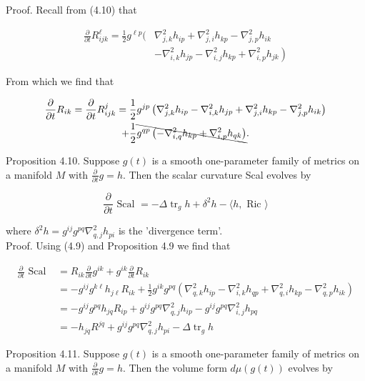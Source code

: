 \documentclass[10pt, letterpaper]{article}
\begin{document}
Proof. Recall from (4.10) that

$$
\begin{aligned}
\frac{\partial}{\partial t} R_{i j k}^{\ell}=\frac{1}{2} g^{\ell p}( & \nabla_{j, k}^{2} h_{i p}+\nabla_{j, i}^{2} h_{k p}-\nabla_{j, p}^{2} h_{i k} \\
& \left.-\nabla_{i, k}^{2} h_{j p}-\nabla_{i, j}^{2} h_{k p}+\nabla_{i, p}^{2} h_{j k}\right)
\end{aligned}
$$

From which we find that

$$
\begin{gathered}
\frac{\partial}{\partial t} R_{i k}=\frac{\partial}{\partial t} R_{i j k}^{j}=\frac{1}{2} g^{j p}\left(\nabla_{j, k}^{2} h_{i p}-\nabla_{i, k}^{2} h_{j p}+\nabla_{j, i}^{2} h_{k p}-\nabla_{j, p}^{2} h_{i k}\right) \\
+\frac{1}{2} \bcancel{g^{q p}\left(-\nabla_{i, q}^{2} h_{k p}+\nabla_{i, p}^{2} h_{q k}\right)} .
\end{gathered}
$$

Proposition 4.10. Suppose $g(t)$ is a smooth one-parameter family of metrics on a manifold $M$ with $\frac{\partial}{\partial t} g=h$. Then the scalar curvature Scal evolves by

$$
\frac{\partial}{\partial t} \text { Scal }=-\Delta \operatorname{tr}_{g} h+\delta^{2} h-\langle h, \text { Ric }\rangle
$$

where $\delta^{2} h=g^{i j} g^{p q} \nabla_{q, j}^{2} h_{p i}$ is the 'divergence term'.\\
Proof. Using (4.9) and Proposition 4.9 we find that

$$
\begin{aligned}
\frac{\partial}{\partial t} \text { Scal } & =R_{i k} \frac{\partial}{\partial t} g^{i k}+g^{i k} \frac{\partial}{\partial t} R_{i k} \\
& =-g^{i j} g^{k \ell} h_{j \ell} R_{i k}+\frac{1}{2} g^{i k} g^{p q}\left(\nabla_{q, k}^{2} h_{i p}-\nabla_{i, k}^{2} h_{q p}+\nabla_{q, i}^{2} h_{k p}-\nabla_{q, p}^{2} h_{i k}\right) \\
& =-g^{i j} g^{p q} h_{j q} R_{i p}+g^{i j} g^{p q} \nabla_{q, j}^{2} h_{i p}-g^{i j} g^{p q} \nabla_{i, j}^{2} h_{p q} \\
& =-h_{j q} R^{j q}+g^{i j} g^{p q} \nabla_{q, j}^{2} h_{p i}-\Delta \operatorname{tr}_{g} h
\end{aligned}
$$

Proposition 4.11. Suppose $g(t)$ is a smooth one-parameter family of metrics on a manifold $M$ with $\frac{\partial}{\partial t} g=h$. Then the volume form $d \mu(g(t))$ evolves by
\end{document}
